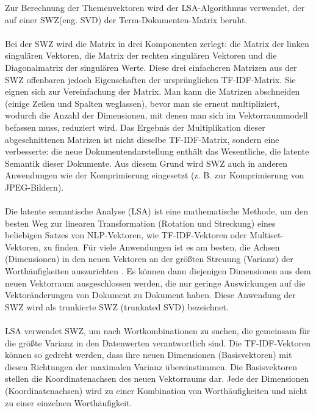 Zur Berechnung der Themenvektoren wird der \ac{LSA}-Algorithmus verwendet, der auf einer \ac{SWZ}(eng. \ac{SVD}) der Term-Dokumenten-Matrix beruht. \cite{dumais_using_1988}\\\\
Bei der \ac{SWZ} wird die Matrix in drei Komponenten zerlegt: die Matrix der linken singulären Vektoren, die Matrix der rechten singulären Vektoren und die Diagonalmatrix der singulären Werte. 
Diese drei einfacheren Matrizen aus der \ac{SWZ} offenbaren jedoch Eigenschaften der ursprünglichen \ac{TF-IDF}-Matrix. 
Sie eignen sich zur Vereinfachung der Matrix. 
Man kann die Matrizen abschneiden (einige Zeilen und Spalten weglassen), bevor man sie erneut multipliziert, wodurch die Anzahl der Dimensionen, mit denen man sich im Vektorraummodell befassen muss, reduziert wird. 
Das Ergebnis der Multiplikation dieser abgeschnittenen Matrizen ist nicht dieselbe \ac{TF-IDF}-Matrix, sondern eine verbesserte: die neue Dokumentendarstellung enthält das Wesentliche, die latente Semantik dieser Dokumente. 
Aus diesem Grund wird \ac{SWZ} auch in anderen Anwendungen wie der Komprimierung eingesetzt (z. B. zur Komprimierung von JPEG-Bildern). \cite{lane_natural_2019}\\\\
Die latente semantische Analyse (\ac{LSA}) ist eine mathematische Methode, um den besten Weg zur linearen Transformation (Rotation und Streckung) eines beliebigen Satzes von \ac{NLP}-Vektoren, wie \ac{TF-IDF}-Vektoren oder Multiset-Vektoren, zu finden. 
Für viele Anwendungen ist es am besten, die Achsen (Dimensionen) in den neuen Vektoren an der größten Streuung (Varianz) der Worthäufigkeiten auszurichten \cite{jurafsky_speech_2009}.
Es können dann diejenigen Dimensionen aus dem neuen Vektorraum ausgeschlossen werden, die nur geringe Auswirkungen auf die Vektoränderungen von Dokument zu Dokument haben. 
Diese Anwendung der \ac{SWZ} wird als trunkierte \ac{SWZ} (trunkated \ac{SVD}) bezeichnet. \cite{lane_natural_2019}\\\\
\ac{LSA} verwendet \ac{SWZ}, um nach Wortkombinationen zu suchen, die gemeinsam für die größte Varianz in den Datenwerten verantwortlich sind. 
Die \ac{TF-IDF}-Vektoren können so gedreht werden, dass ihre neuen Dimensionen (Basisvektoren) mit diesen Richtungen der maximalen Varianz übereinstimmen. 
Die Basisvektoren stellen die Koordinatenachsen des neuen Vektorraums dar. 
Jede der Dimensionen (Koordinatenachsen) wird zu einer Kombination von Worthäufigkeiten und nicht zu einer einzelnen Worthäufigkeit. 
